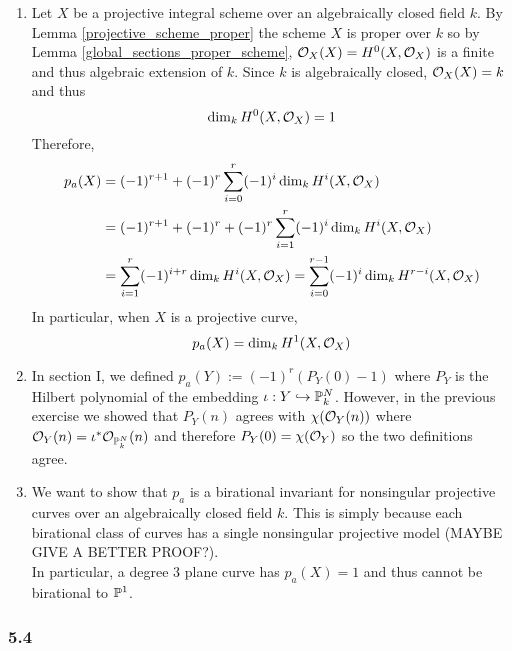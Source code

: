 \documentclass[12pt]{article}
\begin{document}
\begin{enumerate}
\item Let $X$ be a projective integral scheme over an algebraically closed field $k$. By Lemma \ref{projective_scheme_proper} the scheme $X$ is proper over $k$ so by Lemma \ref{global_sections_proper_scheme}, $\struct{X}(X) = H^0(X, \struct{X})$ is a finite and thus algebraic extension of $k$. Since $k$ is algebraically closed, $\struct{X}(X) = k$
 and thus \[ \dim_k H^0(X, \struct{X}) = 1 \]
Therefore,
\begin{align*}
p_a(X) & = (-1)^{r + 1} + (-1)^r \sum_{i = 0}^r (-1)^i \dim_k H^i(X, \struct{X})
\\
& = (-1)^{r + 1} + (-1)^r + (-1)^r \sum_{i = 1}^r (-1)^i \dim_k H^i(X, \struct{X})
\\
& = \sum_{i = 1}^r (-1)^{i + r} \dim_k H^i(X, \struct{X}) = \sum_{i = 0}^{r-1} (-1)^i \dim_k H^{r - i}(X, \struct{X})
\end{align*}
In particular, when $X$ is a projective curve,
\[ p_a(X) = \dim_k H^1(X, \struct{X}) \]

\item In section I, we defined $p_a(Y) := (-1)^r (P_Y(0) - 1)$ where $P_Y$ is the Hilbert polynomial of the embedding $\iota : Y \embed \P^N_k$. However, in the previous exercise we showed that $P_Y(n)$ agrees with $\chi(\struct{Y}(n))$ where $\struct{Y}(n) = \iota^* \struct{\P^N_k}(n)$ and therefore $P_Y(0) = \chi(\struct{Y})$ so the two definitions agree.

\item We want to show that $p_a$ is a birational invariant for nonsingular projective curves over an algebraically closed field $k$. This is simply because each birational class of curves has a single nonsingular projective model (MAYBE GIVE A BETTER PROOF?).
\bigskip\\
In particular, a degree $3$ plane curve has $p_a(X) = 1$ and thus cannot be birational to $\P^1$.
\end{enumerate}

\subsubsection{5.4}
\end{document}
